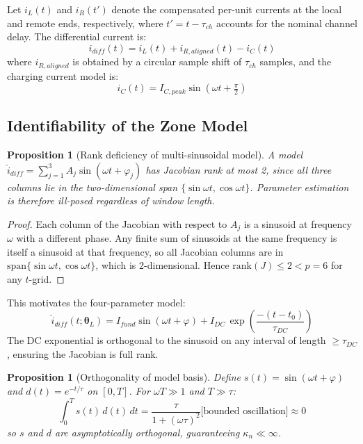 \documentclass[12pt,a4paper]{article}
\newtheorem{proposition}[theorem]{Proposition}
\newcommand{\kappan}{\kappa_n}
\newcommand{\thetaL}{\boldsymbol{\theta}_L}
\newcommand{\Idc}{I_{DC}}
\begin{document}
Let $i_L(t)$ and $i_R(t')$ denote the compensated per-unit currents at the
local and remote ends, respectively, where $t' = t - \tau_{ch}$ accounts for
the nominal channel delay.  The differential current is:
\begin{equation}
  i_{diff}(t) = i_L(t) + i_{R,aligned}(t) - i_C(t)
  \label{eq:idiff_87L}
\end{equation}
where $i_{R,aligned}$ is obtained by a circular sample shift of $\tau_{ch}$
samples, and the charging current model is:
\begin{equation}
  i_C(t) = I_{C,peak}\sin\!\left(\omega t + \tfrac{\pi}{2}\right)
  \label{eq:iC}
\end{equation}

\subsection{Identifiability of the Zone Model}
\label{sec:87L_identifiability}

\begin{proposition}[Rank deficiency of multi-sinusoidal model]
\label{prop:rank}
A model $\hat{i}_{diff} = \sum_{j=1}^3 A_j \sin(\omega t + \varphi_j)$ has
Jacobian rank at most 2, since all three columns lie in the two-dimensional
span $\{\sin\omega t, \cos\omega t\}$.  Parameter estimation is therefore
ill-posed regardless of window length.
\end{proposition}

\begin{proof}
Each column of the Jacobian with respect to $A_j$ is a sinusoid at
frequency $\omega$ with a different phase.  Any finite sum of sinusoids at
the same frequency is itself a sinusoid at that frequency, so all Jacobian
columns are in $\mathrm{span}\{\sin\omega t, \cos\omega t\}$, which is
2-dimensional.  Hence $\mathrm{rank}(J) \le 2 < p = 6$ for any $t$-grid.
\end{proof}

This motivates the four-parameter model:
\begin{equation}
  \hat{i}_{diff}(t;\thetaL)
  = I_{fund}\sin(\omega t + \varphi)
  + \Idc\,\exp\!\left(\frac{-(t-t_0)}{\tau_{DC}}\right)
  \label{eq:87L_model}
\end{equation}
The DC exponential is orthogonal to the sinusoid on any interval of length
$\ge \tau_{DC}$, ensuring the Jacobian is full rank.

\begin{proposition}[Orthogonality of model basis]
\label{prop:ortho}
Define $s(t) = \sin(\omega t + \varphi)$ and $d(t) = e^{-t/\tau}$ on
$[0, T]$.  For $\omega T \gg 1$ and $T \gg \tau$:
\begin{equation}
  \int_0^T s(t)\,d(t)\,dt
  = \frac{\tau}{1 + (\omega\tau)^2}\bigl[\text{bounded oscillation}\bigr]
  \approx 0
  \label{eq:ortho}
\end{equation}
so $s$ and $d$ are asymptotically orthogonal, guaranteeing $\kappan \ll \infty$.
\end{proposition}
\end{document}
